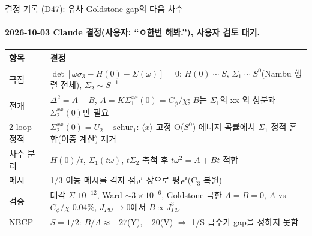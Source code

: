 \begin{frame}[label=decisions-d47-pseudo-goldstone]{결정 기록 (D47): 유사 Goldstone gap의 다음 차수}
  \framesubtitle{2026-10-03 Claude 결정(사용자: ``ㅇ한번 해봐.''), 사용자 검토 대기.}
  \small\renewcommand{\arraystretch}{1.12}
  \begin{tabularx}{\textwidth}{@{}P{3.0cm}Y@{}}
    \toprule
    항목 & 결정 \\
    \midrule
    극점 & $\det[\omega\sigma_3-H(0)-\Sigma(\omega)]=0$; $H(0)\sim S$, $\Sigma_1\sim S^0$(Nambu 행렬 전체), $\Sigma_2\sim S^{-1}$ \\
    전개 & $\Delta^2=A+B$, $A=K\Sigma_1^{xx}(0)=C_\phi/\chi$; $B$는 $\Sigma_1$의 xx 외 성분과 $\Sigma_2^{xx}(0)$만 필요 \\
    2-loop 정적 & $\Sigma_2^{xx}(0)=U_2-\mathrm{schur}_1$: $\langle x\rangle$ 고정 O($S^0$) 에너지 곡률에서 $\Sigma_1$ 정적 혼합(이중 계산) 제거 \\
    차수 분리 & $H(0)/t$, $\Sigma_1(t\omega)$, $t\Sigma_2$ 축척 후 $t\omega^2=A+Bt$ 적합 \\
    메시 & 1/3 이동 메시를 격자 점군 상으로 평균(C$_3$ 복원) \\
    검증 & 대각 $\Sigma$ $10^{-12}$, Ward $\sim3\times10^{-6}$, Goldstone 극한 $A=B=0$, $A$ vs $C_\phi/\chi$ 0.04\%, $J_{PD}\to0$에서 $B\propto J_{PD}^3$ \\
    NBCP & $S=1/2$: $B/A\approx-27$(Y), $-20$(V) $\Rightarrow$ 1/S 급수가 gap을 정하지 못함 \\
    \bottomrule
  \end{tabularx}
\end{frame}

